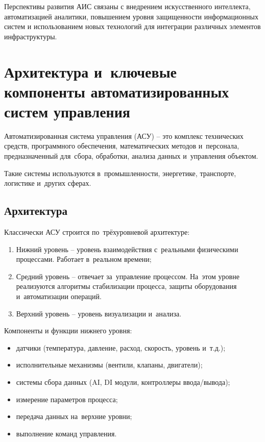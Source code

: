 \documentclass{ou}
\begin{document}
Перспективы развития АИС связаны с внедрением искусственного интеллекта, автоматизацией аналитики, повышением уровня защищенности информационных систем и использованием новых технологий для интеграции различных элементов инфраструктуры.
\newpage
\section{Архитектура и~ключевые компоненты автоматизированных систем управления}
Автоматизированная система управления (АСУ) -- это комплекс технических средств, программного обеспечения, математических методов и~персонала, предназначенный для~сбора, обработки, анализа данных и~управления объектом.

Такие системы используются в~промышленности, энергетике, транспорте, логистике и~других сферах.

\subsection{Архитектура}
Классически АСУ строится по~трёхуровневой архитектуре:
\begin{enumerate}[leftmargin=0em, itemindent=3.75em, nosep, label=\arabic*)]
\item Нижний уровень -- уровень взаимодействия с~реальными физическими процессами. Работает в~реальном времени;
\item Средний уровень -- отвечает за~управление процессом. На~этом уровне реализуются алгоритмы стабилизации процесса, защиты оборудования и~автоматизации операций.
\item Верхний уровень -- уровень визуализации и~анализа.
\end{enumerate}

Компоненты и функции нижнего уровня:
\begin{itemize}[label=-, leftmargin=0em, itemindent=3.35em, nosep]
\item датчики (температура, давление, расход, скорость, уровень и~т.д.);
\item исполнительные механизмы (вентили, клапаны, двигатели);
\item системы сбора данных (AI, DI модули, контроллеры ввода/вывода);
\item измерение параметров процесса;
\item передача данных на~верхние уровни;
\item выполнение команд управления.
\end{itemize}
\end{document}
